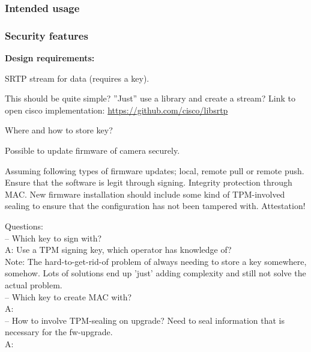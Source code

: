 \documentclass[10pt]{article}
\begin{document}
      \subsubsection{Intended usage}


      \subsubsection{Security features}


    \textbf{Design requirements:}
    \begin{checklist}
      \item{
        SRTP stream for data (requires a key).

        This should be quite simple? ''Just'' use a library and create a
        stream? Link to open cisco implementation:
        \url{https://github.com/cisco/libsrtp}

	Where and how to store key?
      }
      \item{
        Possible to update firmware of camera securely.

        Assuming following types of firmware updates; local, remote pull or
        remote push. Ensure that the software is legit through signing.
        Integrity protection through MAC. New firmware installation should
        include some kind of TPM-involved sealing to ensure that the configuration
        has not been tampered with. Attestation!

        Questions: \\
        -- Which key to sign with? \\
        A: Use a TPM signing key, which operator has knowledge of? \\
        Note: The hard-to-get-rid-of problem of always needing to store a key
        somewhere, somehow. Lots of solutions end up 'just' adding complexity and
        still not solve the actual problem. \\
        -- Which key to create MAC with? \\
        A: \\
        -- How to involve TPM-sealing on upgrade? Need to seal information that
        is necessary for the fw-upgrade.\\
        A: \\

}
\end{checklist}
\end{document}
